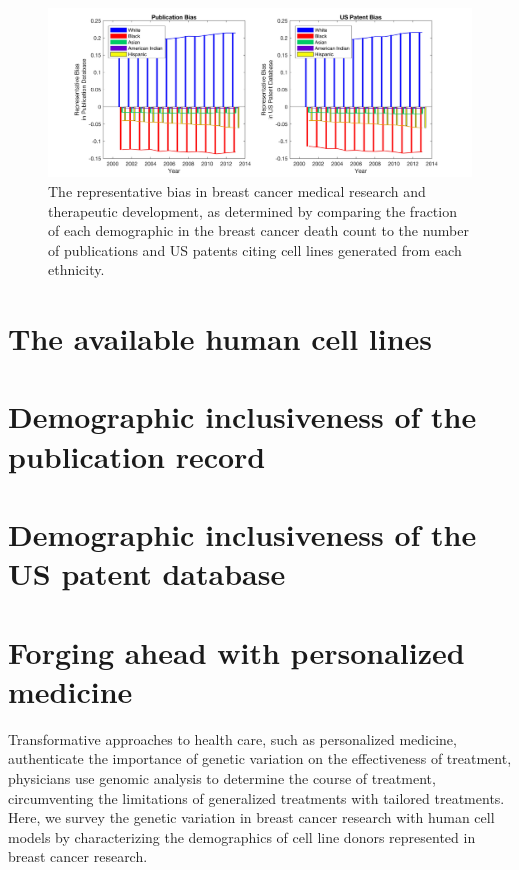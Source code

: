 \documentclass[11pt]{article}
\begin{document}
\begin{figure}[h!]
\centering
\includegraphics[width=1\columnwidth, trim = {10cm 0cm 10cm 0cm}, clip]{Bias.jpg}
\caption{\label{PS} The representative bias in breast cancer medical research and therapeutic development, as determined by comparing the fraction of each demographic in the breast cancer death count to the number of publications and US patents citing cell lines generated from each ethnicity.}
\end{figure}


\section{The available human cell lines}

 \section{Demographic inclusiveness of the publication record}
 
  \section{Demographic inclusiveness of the US patent database}

\section{Forging ahead with personalized medicine}
Transformative approaches to health care, such as personalized medicine, authenticate the importance of genetic variation on the effectiveness of treatment, physicians use genomic analysis to determine the course of treatment, circumventing the limitations of generalized treatments with tailored treatments. Here, we survey the genetic variation in breast cancer research with human cell models by characterizing the demographics of cell line donors represented in breast cancer research. 



\end{document}
